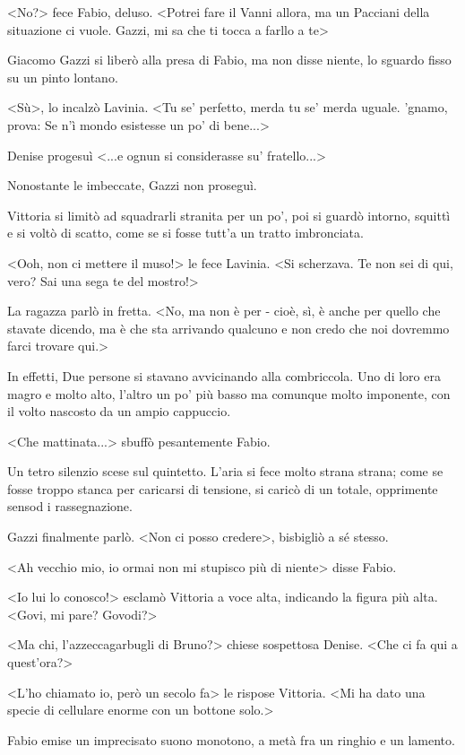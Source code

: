 <No?> fece Fabio, deluso. <Potrei fare il Vanni allora, ma un  Pacciani della situazione ci vuole. Gazzi, mi sa che ti tocca a farllo a te>

Giacomo Gazzi si liberò alla presa di Fabio, ma non disse niente, lo sguardo fisso su un pinto lontano. 

<Sù>, lo incalzò Lavinia. <Tu se' perfetto, merda tu se' merda uguale. 'gnamo, prova: Se n'ì mondo esistesse un po' di bene...>

Denise progesuì <...e ognun si considerasse su' fratello...>

Nonostante le imbeccate, Gazzi non proseguì.

Vittoria si limitò ad squadrarli stranita per un po', poi si guardò intorno, squittì e si voltò di scatto, come se si fosse tutt'a un tratto imbronciata.

<Ooh, non ci mettere il muso!> le fece Lavinia. <Si scherzava. Te non sei di qui, vero? Sai una sega te del mostro!>

La ragazza parlò in fretta. <No, ma non è per - cioè, sì, è anche per quello che stavate dicendo, ma è che sta arrivando qualcuno e non credo che noi dovremmo farci trovare qui.> 

In effetti, Due persone si stavano avvicinando alla combriccola. Uno di loro era magro e molto alto, l'altro un po' più basso ma comunque molto imponente, con il volto nascosto da un ampio cappuccio.

<Che mattinata...> sbuffò pesantemente Fabio.

Un tetro silenzio scese sul quintetto. L'aria si fece molto strana strana; come se fosse troppo stanca per caricarsi di tensione, si caricò di un totale, opprimente sensod i rassegnazione.

Gazzi finalmente parlò. <Non ci posso credere>, bisbigliò a sé stesso.

<Ah vecchio mio, io ormai non mi stupisco più di niente> disse Fabio.

<Io lui lo conosco!> esclamò Vittoria a voce alta, indicando la figura più alta. <Govi, mi pare? Govodi?>

<Ma chi, l'azzeccagarbugli di Bruno?> chiese sospettosa Denise. <Che ci fa qui a quest'ora?>

<L'ho chiamato io, però un secolo fa> le rispose Vittoria. <Mi ha dato una specie di cellulare enorme con un bottone solo.>

Fabio emise un imprecisato suono monotono, a metà fra un ringhio e un lamento.

